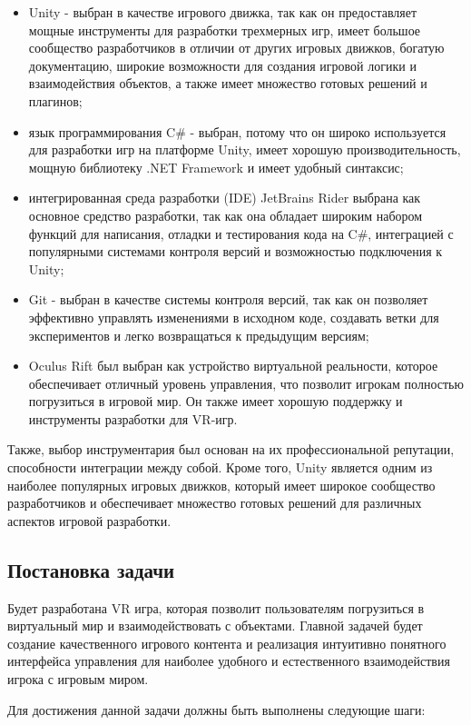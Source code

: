 \documentclass{../mirea-prog-lang}
\begin{document}
\begin{itemize}
	\item Unity - выбран в качестве игрового движка, так как он предоставляет мощные инструменты для разработки трехмерных игр, имеет большое сообщество разработчиков в отличии от других игровых движков, богатую документацию, широкие возможности для создания игровой логики и взаимодействия объектов, а также имеет множество готовых решений и плагинов;
	\item язык программирования C\# - выбран, потому что он широко используется для разработки игр на платформе Unity, имеет хорошую производительность, мощную библиотеку .NET Framework и имеет удобный синтаксис;
	\item интегрированная среда разработки (IDE) JetBrains Rider выбрана как основное средство разработки, так как она обладает широким набором функций для написания, отладки и тестирования кода на C\#, интеграцией с популярными системами контроля версий и возможностью подключения к Unity;
	\item Git - выбран в качестве системы контроля версий, так как он позволяет эффективно управлять изменениями в исходном коде, создавать ветки для экспериментов и легко возвращаться к предыдущим версиям;
	\item Oculus Rift был выбран как устройство виртуальной реальности, которое обеспечивает отличный уровень управления, что позволит игрокам полностью погрузиться в игровой мир. Он также имеет хорошую поддержку и инструменты разработки для VR-игр.
\end{itemize}

Также, выбор инструментария был основан на их профессиональной репутации, способности интеграции между собой. Кроме того, Unity является одним из наиболее популярных игровых движков, который имеет широкое сообщество разработчиков и обеспечивает множество готовых решений для различных аспектов игровой разработки.

\subsection{Постановка задачи}

Будет разработана VR игра, которая позволит пользователям погрузиться в виртуальный мир и взаимодействовать с объектами. Главной задачей будет создание качественного игрового контента и реализация интуитивно понятного интерфейса управления для наиболее удобного и естественного взаимодействия игрока с игровым миром.

Для достижения данной задачи должны быть выполнены следующие шаги:
\end{document}
